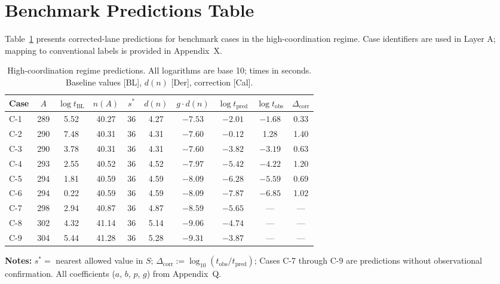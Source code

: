 \section{Benchmark Predictions Table}
\label{sec:sh:predictions}

Table~\ref{tab:sh:predictions} presents corrected-lane predictions for
benchmark cases in the high-coordination regime. Case identifiers are used
in Layer A; mapping to conventional labels is provided in Appendix~X.

\begin{table}[htbp]
\centering
\caption{High-coordination regime predictions. All logarithms are base 10;
times in seconds. Baseline values [BL], $d(n)$ [Der], correction [Cal].}
\label{tab:sh:predictions}
\small
\begin{tabular}{lccccccccc}
\toprule
Case & $A$ & $\log t_{\text{BL}}$ & $n(A)$ & $s^*$ & $d(n)$ &
$g \cdot d(n)$ & $\log t_{\text{pred}}$ & $\log t_{\text{obs}}$ & $\Delta_{\text{corr}}$ \\
\midrule
C-1 & 289 & 5.52 & 40.27 & 36 & 4.27 & $-7.53$ & $-2.01$ & $-1.68$ & 0.33 \\
C-2 & 290 & 7.48 & 40.31 & 36 & 4.31 & $-7.60$ & $-0.12$ & 1.28 & 1.40 \\
C-3 & 290 & 3.78 & 40.31 & 36 & 4.31 & $-7.60$ & $-3.82$ & $-3.19$ & 0.63 \\
C-4 & 293 & 2.55 & 40.52 & 36 & 4.52 & $-7.97$ & $-5.42$ & $-4.22$ & 1.20 \\
C-5 & 294 & 1.81 & 40.59 & 36 & 4.59 & $-8.09$ & $-6.28$ & $-5.59$ & 0.69 \\
C-6 & 294 & 0.22 & 40.59 & 36 & 4.59 & $-8.09$ & $-7.87$ & $-6.85$ & 1.02 \\
C-7 & 298 & 2.94 & 40.87 & 36 & 4.87 & $-8.59$ & $-5.65$ & --- & --- \\
C-8 & 302 & 4.32 & 41.14 & 36 & 5.14 & $-9.06$ & $-4.74$ & --- & --- \\
C-9 & 304 & 5.44 & 41.28 & 36 & 5.28 & $-9.31$ & $-3.87$ & --- & --- \\
\bottomrule
\end{tabular}

\vspace{2mm}
\footnotesize
\textbf{Notes:}
$s^* =$ nearest allowed value in $S$;
$\Delta_{\text{corr}} := \log_{10}(t_{\text{obs}}/t_{\text{pred}})$;
Cases C-7 through C-9 are predictions without observational confirmation.
All coefficients ($a$, $b$, $p$, $g$) from Appendix~Q.
\end{table}

